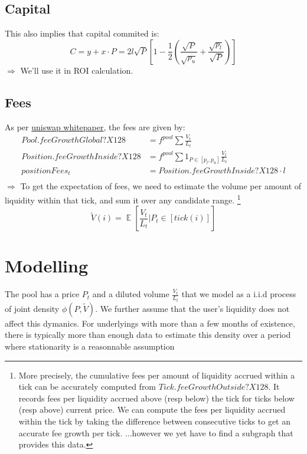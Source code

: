 \documentclass[12pt]{article}
\DeclareMathOperator*{\E}{\mathbb{E}}
\begin{document}
\subsection{Capital}
This also implies that capital commited is:
\begin{equation}
C = y + x \cdot P = 2 l \sqrt{P} [1 - \frac{1}{2}(\frac{\sqrt{P}}{\sqrt{p_u}}+\frac{\sqrt{p_l}}{\sqrt{P}})]
\end{equation}
$\Rightarrow$ We'll use it in ROI calculation.

\subsection{Fees}
As per \href{https://whitepaper.io/document/708/uniswap-whitepaper}{uniswap whitepaper}, the fees are given by:
\begin{eqnarray*}
      Pool.feeGrowthGlobal?X128 &= f^{pool} \sum{\frac{V_t}{L_t}} \\
      Position.feeGrowthInside?X128 &= f^{pool} \sum{1_{P \in [p_l,p_u]} \frac{V_t}{L_t}} \\
      positionFees_t &= Position.feeGrowthInside?X128 \cdot l \\
\end{eqnarray*}
$\Rightarrow$ To get the expectation of fees, we need to estimate the volume per amount of liquidity within that tick, and sum it over any candidate range.
\footnote{
More precisely, the cumulative fees per amount of liquidity accrued within a tick can be accurately computed from $Tick.feeGrowthOutside?X128$.
It records fees per liquidity accrued above (resp below) the tick for ticks below (resp above) current price.
We can compute the fees per liquidity accrued within the tick by taking the difference between consecutive ticks to get an accurate fee growth per tick.
\newline ...however we yet have to find a subgraph that provides this data.
}\begin{equation}
\tilde{V}(i)=\E[\frac{V_t}{L_t} | P_t \in [tick(i)]]
\end{equation}


\section{Modelling}
The pool has a price $P_t$ and a diluted volume $\frac{V_t}{L_t}$ that we model as a i.i.d process of joint density $\phi(P, \tilde{V})$.
\newline \indent We further assume that the user's liquidity does not affect this dymanics.
For underlyings with more than a few months of existence, there is typically more than enough data to estimate this density over a period where stationarity is a reasonnable assumption\\
\end{document}
